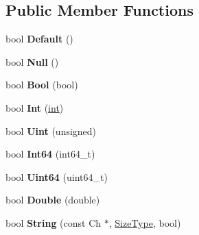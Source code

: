 \subsection*{Public Member Functions}
\begin{DoxyCompactItemize}
\item 
\hypertarget{struct_base_reader_handler_a836437f6ccc37f08ff933f009b18a78c}{}bool {\bfseries Default} ()\label{struct_base_reader_handler_a836437f6ccc37f08ff933f009b18a78c}

\item 
\hypertarget{struct_base_reader_handler_ae2ebbde4628bf3659ddc5d18520935f5}{}bool {\bfseries Null} ()\label{struct_base_reader_handler_ae2ebbde4628bf3659ddc5d18520935f5}

\item 
\hypertarget{struct_base_reader_handler_aa1c3ce42dbb856b3349792dc9d963587}{}bool {\bfseries Bool} (bool)\label{struct_base_reader_handler_aa1c3ce42dbb856b3349792dc9d963587}

\item 
\hypertarget{struct_base_reader_handler_a85e813aaf7189a2f87bd53953324fafc}{}bool {\bfseries Int} (\hyperlink{_s_d_l__thread_8h_a6a64f9be4433e4de6e2f2f548cf3c08e}{int})\label{struct_base_reader_handler_a85e813aaf7189a2f87bd53953324fafc}

\item 
\hypertarget{struct_base_reader_handler_a0e683306cbb7b4e350a35c18c5246f2a}{}bool {\bfseries Uint} (unsigned)\label{struct_base_reader_handler_a0e683306cbb7b4e350a35c18c5246f2a}

\item 
\hypertarget{struct_base_reader_handler_a04011733ea584739c97ad5c6afa15a35}{}bool {\bfseries Int64} (int64\+\_\+t)\label{struct_base_reader_handler_a04011733ea584739c97ad5c6afa15a35}

\item 
\hypertarget{struct_base_reader_handler_a351aa3cd81856a487c21022e9cc64d2b}{}bool {\bfseries Uint64} (uint64\+\_\+t)\label{struct_base_reader_handler_a351aa3cd81856a487c21022e9cc64d2b}

\item 
\hypertarget{struct_base_reader_handler_a8156ea6ae5b8cd23a8b700e92a8af1eb}{}bool {\bfseries Double} (double)\label{struct_base_reader_handler_a8156ea6ae5b8cd23a8b700e92a8af1eb}

\item 
\hypertarget{struct_base_reader_handler_a3ac69e6326d0aeef7b1f2619742bbe00}{}bool {\bfseries String} (const Ch $\ast$, \hyperlink{rapidjson_8h_a5ed6e6e67250fadbd041127e6386dcb5}{Size\+Type}, bool)\label{struct_base_reader_handler_a3ac69e6326d0aeef7b1f2619742bbe00}


\end{DoxyCompactItemize}
